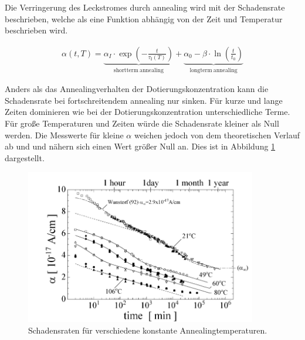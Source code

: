 Die Verringerung des Leckstromes durch annealing wird mit der Schadensrate
beschrieben, welche als eine Funktion abhängig von der Zeit und
Temperatur beschrieben wird.\cite{moll}

\begin{align}
  \alpha(t, T) = \underbrace{\alpha_I \cdot \exp{\left(-\frac{t}{\tau_{\mathrm{I}}(T)}\right)}}_{\mathrm{shortterm \: annealing}} + \underbrace{\alpha_{\mathrm{0}} -\beta \cdot \ln{\left(\frac{t}{t_{\mathrm{0}}}\right)}}_{\mathrm{longterm \: annealing}}
\end{align}

Anders als das Annealingverhalten der Dotierungskonzentration kann die Schadensrate
bei fortschreitendem annealing nur sinken. Für kurze und
lange Zeiten dominieren wie bei der Dotierungskonzentration unterschiedliche
Terme. Für große Temperaturen und Zeiten würde die Schadensrate kleiner als Null
werden. Die Messwerte für kleine $\alpha$ weichen jedoch von dem
theoretischen Verlauf ab und und nähern sich einen Wert größer Null an. Dies
ist in Abbildung \ref{fig:damage_rates} dargestellt.

\begin{figure}
  \includegraphics[width=0.9\textwidth]{logos/schadensraten.PNG}
  \caption{Schadensraten für verschiedene konstante Annealingtemperaturen.\cite{moll}}
  \label{fig:damage_rates}
\end{figure}
